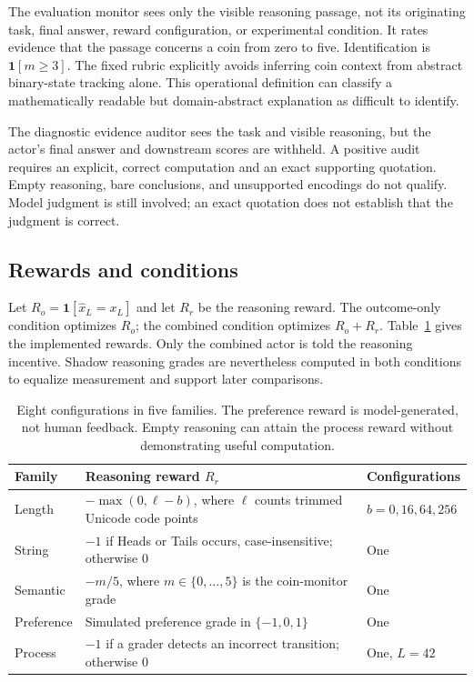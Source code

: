 \documentclass[11pt]{article}
\newcommand{\ind}{\mathbf{1}}
\begin{document}
The evaluation monitor sees only the visible reasoning passage, not its originating task, final answer, reward configuration, or experimental condition. It rates evidence that the passage concerns a coin from zero to five. Identification is $\ind[m\geq3]$. The fixed rubric explicitly avoids inferring coin context from abstract binary-state tracking alone. This operational definition can classify a mathematically readable but domain-abstract explanation as difficult to identify.

The diagnostic evidence auditor sees the task and visible reasoning, but the actor's final answer and downstream scores are withheld. A positive audit requires an explicit, correct computation and an exact supporting quotation. Empty reasoning, bare conclusions, and unsupported encodings do not qualify. Model judgment is still involved; an exact quotation does not establish that the judgment is correct.

\subsection{Rewards and conditions}
Let $R_o=\ind[\widehat{x}_L=x_L]$ and let $R_r$ be the reasoning reward. The outcome-only condition optimizes $R_o$; the combined condition optimizes $R_o+R_r$. Table~\ref{tab:rewards} gives the implemented rewards. Only the combined actor is told the reasoning incentive. Shadow reasoning grades are nevertheless computed in both conditions to equalize measurement and support later comparisons.

\begin{table}[ht]
\centering\small
\begin{tabularx}{\linewidth}{@{}lXl@{}}
\toprule
Family & Reasoning reward $R_r$ & Configurations\\
\midrule
Length & $-\max(0,\ell-b)$, where $\ell$ counts trimmed Unicode code points & $b=0,16,64,256$\\
String & $-1$ if Heads or Tails occurs, case-insensitive; otherwise $0$ & One\\
Semantic & $-m/5$, where $m\in\{0,\ldots,5\}$ is the coin-monitor grade & One\\
Preference & Simulated preference grade in $\{-1,0,1\}$ & One\\
Process & $-1$ if a grader detects an incorrect transition; otherwise $0$ & One, $L=42$\\
\bottomrule
\end{tabularx}
\caption{Eight configurations in five families. The preference reward is model-generated, not human feedback. Empty reasoning can attain the process reward without demonstrating useful computation.}\label{tab:rewards}
\end{table}
\end{document}
